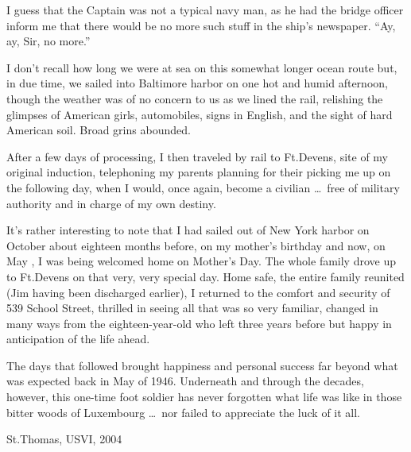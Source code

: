 \documentclass[../m3y]{subfiles}
\begin{document}
I guess that the Captain was not a typical navy man, as he had the bridge officer inform me that there would be no more such stuff in the ship's newspaper. ``Ay, ay, Sir, no more.''

I don't recall how long we were at sea on this somewhat longer ocean route but, in due time, we sailed into Baltimore harbor on one hot and humid afternoon, though the weather was of no concern to us as we lined the rail, relishing the glimpses of American girls, automobiles, signs in English, and the sight of hard American soil. Broad grins abounded.

After a few days of processing, I then traveled by rail to Ft.\@ Devens, site of my original induction, telephoning my parents planning for their picking me up on the following day, when I would, once again, become a civilian \ldots\ free of military authority and in charge of my own destiny.

It's rather interesting to note that I had sailed out of New York harbor on October  about eighteen months before, on my mother's birthday and now, on May , I was being welcomed home on Mother's Day. The whole family drove up to Ft.\@ Devens on that very, very special day. Home safe, the entire family reunited (Jim having been discharged earlier), I returned to the comfort and security of 539 School Street, thrilled in seeing all that was so very familiar, changed in many ways from the eighteen-year-old who left three years before but happy in anticipation of the life ahead.

The days that followed brought happiness and personal success far beyond what was expected back in May of 1946. Underneath and through the decades, however, this one-time foot soldier has never forgotten what life was like in those bitter woods of Luxembourg \ldots\ nor failed to appreciate the luck of it all.

\begin{flushright}St.\@ Thomas, USVI, 2004\end{flushright}
\end{document}
